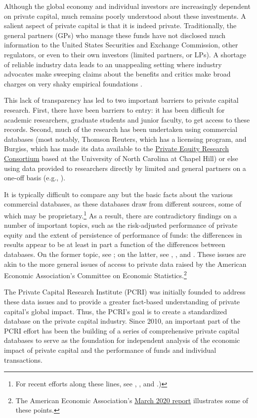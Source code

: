 \documentclass[
]{book}
\begin{document}
Although the global economy and individual investors are increasingly dependent on private capital, much remains poorly understood about these investments. A salient aspect of private capital is that it is indeed private. Traditionally, the general partners (GPs) who manage these funds have not disclosed much information to the United States Securities and Exchange Commission, other regulators, or even to their own investors (limited partners, or LPs). A shortage of reliable industry data leads to an unappealing setting where industry advocates make sweeping claims about the benefits and critics make broad charges on very shaky empirical foundations \citep{kaplan2017}.

This lack of transparency has led to two important barriers to private capital research. First, there have been barriers to entry: it has been difficult for academic researchers, graduate students and junior faculty, to get access to these records. Second, much of the research has been undertaken using commercial databases (most notably, Thomson Reuters, which has a licensing program, and Burgiss, which has made its data available to the \href{http://uncipc.org/index.php/initiativecat/private-equity/}{Private Equity Research Consortium} based at the University of North Carolina at Chapel Hill) or else using data provided to researchers directly by limited and general partners on a one-off basis (e.g., \citet{gompers1997}).

It is typically difficult to compare any but the basic facts about the various commercial databases, as these databases draw from different sources, some of which may be proprietary.\footnote{For recent efforts along these lines, see \citet{brown2015}, \citet{maats2011}, and \citet{kaplan2017}.)} As a result, there are contradictory findings on a number of important topics, such as the risk-adjusted performance of private equity and the extent of persistence of performance of funds: the differences in results appear to be at least in part a function of the differences between databases. On the former topic, see \citet{korteweg2019}; on the latter, see \citet{braun2017}, \citet{harris2014}, and \citet{korteweg2015}. These issues are akin to the more general issues of access to private data raised by the American Economic Association's Committee on Economic Statistics.\footnote{The American Economic Association's \href{https://www.aeaweb.org/content/file?id=11794}{March 2020 report} illustrates some of these points.}

The Private Capital Research Institute (PCRI) was initially founded to address these data issues and to provide a greater fact-based understanding of private capital's global impact. Thus, the PCRI's goal is to create a standardized database on the private capital industry. Since 2010, an important part of the PCRI effort has been the building of a series of comprehensive private capital databases to serve as the foundation for independent analysis of the economic impact of private capital and the performance of funds and individual transactions.
\end{document}
